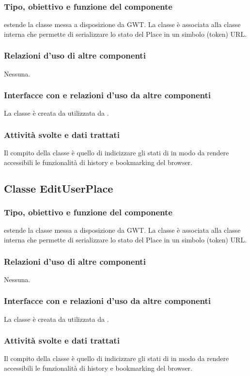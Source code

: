 \subsubsection*{Tipo, obiettivo e funzione del componente}
 estende la classe  messa a disposizione da GWT. La
classe \`e associata alla classe interna  che permette di
serializzare lo stato del Place in un simbolo (token) URL.
\subsubsection*{Relazioni d'uso di altre componenti}
Nessuna.
\subsubsection*{Interfacce con e relazioni d'uso da altre componenti}
La classe \`e creata da  utilizzata da .
\subsubsection*{Attivit\`a svolte e dati trattati}
Il compito della classe \`e quello di indicizzare gli stati di
 in modo da rendere accessibili le funzionalit\`a di history
e bookmarking del browser.

\subsection{Classe EditUserPlace}
\subsubsection*{Tipo, obiettivo e funzione del componente}
 estende la classe  messa a disposizione da GWT. La
classe \`e associata alla classe interna  che permette di
serializzare lo stato del Place in un simbolo (token) URL.
\subsubsection*{Relazioni d'uso di altre componenti}
Nessuna.
\subsubsection*{Interfacce con e relazioni d'uso da altre componenti}
La classe \`e creata da  utilizzata da .
\subsubsection*{Attivit\`a svolte e dati trattati}
Il compito della classe \`e quello di indicizzare gli stati di
 in modo da rendere accessibili le funzionalit\`a di
history e bookmarking del browser.

